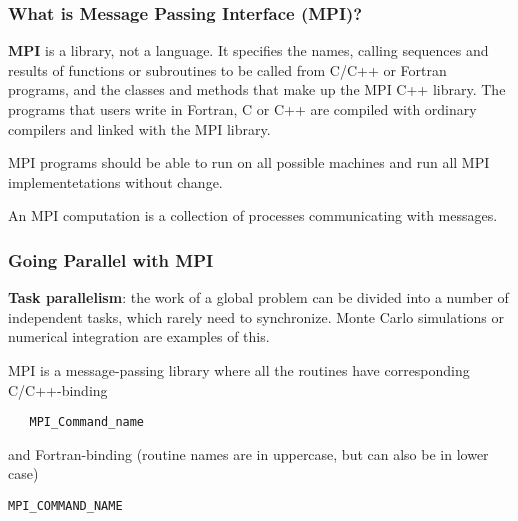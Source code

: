 \documentclass{beamer}
\begin{document}
\begin{frame}
\frametitle{What is Message Passing Interface (MPI)?}

\begin{block}{}

\textbf{MPI} is a library, not a language. It specifies the names, calling sequences and results of functions
or subroutines to be called from C/C++ or Fortran programs, and the classes and methods that make up the MPI C++
library. The programs that users write in Fortran, C or C++ are compiled with ordinary compilers and linked
with the MPI library.

MPI programs should be able to run
on all possible machines and run all MPI implementetations without change.

An MPI computation is a collection of processes communicating with messages.

\end{block}
\end{frame}

\begin{frame}
\frametitle{Going Parallel with MPI}

\begin{block}{}
\textbf{Task parallelism}: the work of a global problem can be divided
into a number of independent tasks, which rarely need to synchronize. 
Monte Carlo simulations or numerical integration are examples of this.

MPI is a message-passing library where all the routines
have corresponding C/C++-binding


\begin{verbatim}
   MPI_Command_name

\end{verbatim}

and Fortran-binding (routine names are in uppercase, but can also be in lower case)


\begin{Verbatim}[numbers=none,fontsize=\fontsize{9pt}{9pt},baselinestretch=0.95]
   MPI_COMMAND_NAME

\end{Verbatim}

\end{block}
\end{frame}
\end{document}
